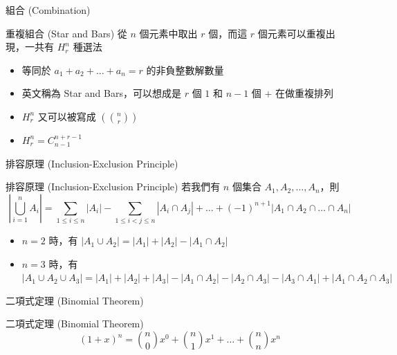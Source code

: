 \documentclass[aspectratio=169]{beamer}
\begin{document}
\begin{frame}{組合 (Combination)}
    \begin{alertblock}{重複組合 (Star and Bars)}
        從 $n$ 個元素中取出 $r$ 個，而這 $r$ 個元素可以重複出現，一共有 $H^n_r$ 種選法
        \begin{itemize}
            \item 等同於 $a_1+a_2+\dots+a_n = r$ 的非負整數解數量
            \item 英文稱為 Star and Bars，可以想成是 $r$ 個 $1$ 和 $n-1$ 個 $+$ 在做重複排列
            \item $H^n_r$ 又可以被寫成 $\displaystyle \left(\!\!{\binom {n}{r}}\!\!\right)$
            \item $H^n_r = C^{n+r-1}_{n-1}$ 
        \end{itemize}
    \end{alertblock}
\end{frame}

\begin{frame}{排容原理 (Inclusion-Exclusion Principle)}
    \begin{alertblock}{排容原理 (Inclusion-Exclusion Principle)}
        若我們有 $n$ 個集合 $A_1,A_2,\dots,A_n$，則
        $$\left|\bigcup^n_{i=1} A_i\right| = \sum_{1 \le i \le n} |A_i| - \sum_{1 \le i < j \le n} |A_i \cap A_j| + \dots + (-1)^{n+1} |A_1 \cap A_2 \cap \dots \cap A_n| $$
        \vspace{5mm}
        \begin{itemize}
            \item $n=2$ 時，有 $|A_1 \cup A_2| = |A_1| + |A_2| - |A_1 \cap A_2|$
            \item $n=3$ 時，有 $|A_1 \cup A_2 \cup A_3| = |A_1| + |A_2| + |A_3| - |A_1 \cap A_2| - |A_2 \cap A_3| - |A_3 \cap A_1| + |A_1 \cap A_2 \cap A_3|$
        \end{itemize}
    \end{alertblock}
\end{frame}

\begin{frame}{二項式定理 (Binomial Theorem)}
    \begin{alertblock}{二項式定理 (Binomial Theorem)}
        $$(1+x)^n = \binom{n}{0}x^0 + \binom{n}{1}x^1+ \dots + \binom{n}{n}x^n$$
    \end{alertblock}
\end{frame}
\end{document}
